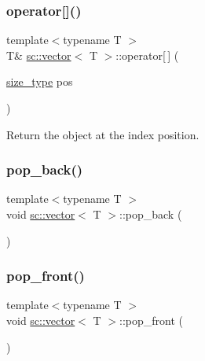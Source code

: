 \subsubsection{\texorpdfstring{operator[]()}{operator[]()}}
{\footnotesize\ttfamily template$<$typename T $>$ \\
T\& \hyperlink{classsc_1_1vector}{sc\+::vector}$<$ T $>$\+::operator\mbox{[}$\,$\mbox{]} (\begin{DoxyParamCaption}\item[{\hyperlink{classsc_1_1vector_aa4500ebad5be45f8d469fc4b5d62b19d}{size\+\_\+type}}]{pos }\end{DoxyParamCaption})\hspace{0.3cm}{\ttfamily [inline]}}



Return the object at the index position. 

\mbox{\label{classsc_1_1vector_a3dbc8155ac3737f9a9ffe7f454a8f321}} 
\subsubsection{\texorpdfstring{pop\+\_\+back()}{pop\_back()}}
{\footnotesize\ttfamily template$<$typename T $>$ \\
void \hyperlink{classsc_1_1vector}{sc\+::vector}$<$ T $>$\+::pop\+\_\+back (\begin{DoxyParamCaption}{ }\end{DoxyParamCaption})}

\mbox{\label{classsc_1_1vector_aad4717b5827454557f7c9e5c3edd5a7e}} 
\subsubsection{\texorpdfstring{pop\+\_\+front()}{pop\_front()}}
{\footnotesize\ttfamily template$<$typename T $>$ \\
void \hyperlink{classsc_1_1vector}{sc\+::vector}$<$ T $>$\+::pop\+\_\+front (\begin{DoxyParamCaption}{ }\end{DoxyParamCaption})}

\mbox{\label{classsc_1_1vector_a5b4a8c72d19d0bdab794e495fb1e334d}} 
